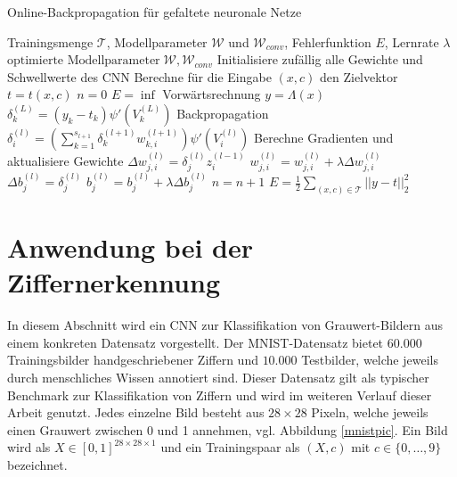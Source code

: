 \begin{algorithm}[h]
    \caption{Online-Backpropagation für gefaltete neuronale Netze}
    \label{alg:cnn_online}
    \begin{algorithmic}
    \Require  Trainingsmenge $\mathcal{T}$, Modellparameter $\mathcal{W}$ und $\mathcal{W}_{conv}$, Fehlerfunktion $E$, Lernrate $\lambda$ 
    \Ensure $\text{optimierte Modellparameter} \; \mathcal{W}, \mathcal{W}_{conv}$
    \State Initialisiere zufällig alle Gewichte und Schwellwerte des CNN 
    \State Berechne für die Eingabe $(x,c)$ den Zielvektor $t=t(x,c)$
    \State $n=0$  
    \State $E=\inf$
     
        \State Vorwärtsrechnung $y=\Lambda(x)$
            \State $\delta_k^{(L)}=(y_k-t_k) \psi'(V^{(L)}_k)$
        \EndFor
        \State Backpropagation
                    \State $\delta^{(l)}_i= \left(\sum_{k=1}^{s_{l+1}} \delta_k^{(l+1)} w^{(l+1)}_{k,i}\right) \psi'(V^{(l)}_i)$
                \EndFor
             \EndFor
        \EndFor 
        \State Berechne Gradienten und aktualisiere Gewichte
        \State $\Delta w_{j,i}^{(l)}= \delta_j^{(l)} z^{(l-1)}_i$
        \State $w^{(l)}_{j,i}= w^{(l)}_{j,i} + \lambda \Delta w_{j,i}^{(l)}$
        \EndFor
        \State $\Delta b^{(l)}_j=\delta^{(l)}_j$
        \State $b^{(l)}_j=b^{(l)}_j + \lambda \Delta b^{(l)}_j$
        \EndFor
        \EndFor
        \State $n=n+1$
    \EndFor
    \State $E=\frac{1}{2} \sum_{(x,c) \in \mathcal{T}} ||y-t||_2^2$
    \EndWhile
    \end{algorithmic}
\end{algorithm}


\section{Anwendung bei der Ziffernerkennung}
\label{abs:model_mnist}
In diesem Abschnitt wird ein CNN zur Klassifikation von Grauwert-Bildern aus einem konkreten Datensatz vorgestellt. Der MNIST-Datensatz\cite{DBLP:journals/pieee/LeCunBBH98} bietet $60.000$ Trainingsbilder handgeschriebener Ziffern und $10.000$ Testbilder, welche jeweils durch menschliches Wissen annotiert sind. Dieser Datensatz gilt als typischer Benchmark zur Klassifikation von Ziffern und wird im weiteren Verlauf dieser Arbeit genutzt. Jedes einzelne Bild besteht aus $28 \times 28$ Pixeln, welche jeweils einen Grauwert zwischen 0 und 1 annehmen, vgl. Abbildung \ref{mnistpic}. Ein Bild wird als $X \in [0,1]^{28 \times 28 \times 1}$ und ein Trainingspaar als $(X,c)$ mit $c \in \{0, \ldots, 9\}$ bezeichnet. 

